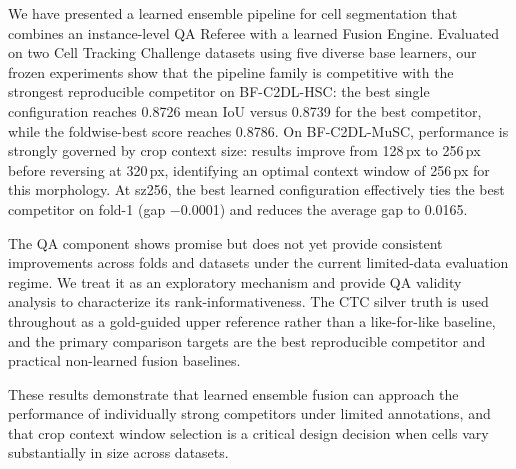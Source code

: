 We have presented a learned ensemble pipeline for cell segmentation that combines an instance-level
QA Referee with a learned Fusion Engine. Evaluated on two Cell Tracking Challenge datasets using
five diverse base learners, our frozen experiments show that the pipeline family is competitive
with the strongest reproducible competitor on BF-C2DL-HSC: the best single configuration reaches
0.8726 mean IoU versus 0.8739 for the best competitor, while the foldwise-best score reaches
0.8786. On BF-C2DL-MuSC, performance is strongly governed by crop context size: results improve
from 128\,px to 256\,px before reversing at 320\,px, identifying an optimal context window of
256\,px for this morphology. At sz256, the best learned configuration effectively ties the best
competitor on fold-1 (gap $-$0.0001) and reduces the average gap to 0.0165.

The QA component shows promise but does not yet provide consistent improvements across folds and
datasets under the current limited-data evaluation regime. We treat it as an exploratory mechanism
and provide QA validity analysis to characterize its rank-informativeness. The CTC silver truth is
used throughout as a gold-guided upper reference rather than a like-for-like baseline, and the
primary comparison targets are the best reproducible competitor and practical non-learned fusion
baselines.

These results demonstrate that learned ensemble fusion can approach the performance of individually
strong competitors under limited annotations, and that crop context window selection is a critical
design decision when cells vary substantially in size across datasets.









